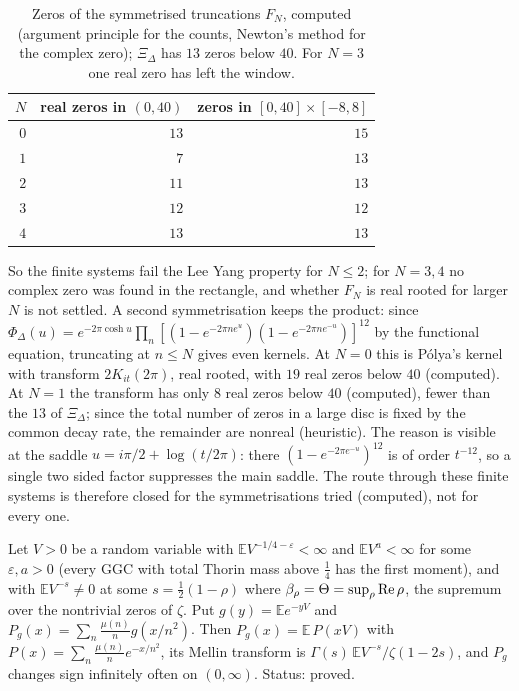 \begin{table}[htbp]
\centering\small
\begin{tabular}{rrr}
\toprule
$N$ & real zeros in $(0,40)$ & zeros in $[0,40]\times[-8,8]$\\
\midrule
$0$ & $13$ & $15$\\
$1$ & $7$ & $13$\\
$2$ & $11$ & $13$\\
$3$ & $12$ & $12$\\
$4$ & $13$ & $13$\\
\bottomrule
\end{tabular}
\caption{Zeros of the symmetrised truncations $F_N$, computed (argument principle for the counts, Newton's method for the complex zero); $\Xi_\Delta$ has $13$ zeros below $40$. For $N=3$ one real zero has left the window.}\label{dl:tab:r4}
\end{table}

So the finite systems fail the Lee Yang property for $N\le2$; for $N=3,4$ no complex zero was found in the rectangle, and whether $F_N$ is real rooted for larger $N$ is not settled. A second symmetrisation keeps the product: since $\Phi_\Delta(u)=e^{-2\pi\cosh u}\prod_n[(1-e^{-2\pi ne^u})(1-e^{-2\pi ne^{-u}})]^{12}$ by the functional equation, truncating at $n\le N$ gives even kernels. At $N=0$ this is P\'olya's kernel with transform $2K_{it}(2\pi)$, real rooted, with $19$ real zeros below $40$ (computed). At $N=1$ the transform has only $8$ real zeros below $40$ (computed), fewer than the $13$ of $\Xi_\Delta$; since the total number of zeros in a large disc is fixed by the common decay rate, the remainder are nonreal (heuristic). The reason is visible at the saddle $u=i\pi/2+\log(t/2\pi)$: there $(1-e^{-2\pi e^{-u}})^{12}$ is of order $t^{-12}$, so a single two sided factor suppresses the main saddle. The route through these finite systems is therefore closed for the symmetrisations tried (computed), not for every one.

\begin{proposition}\label{dl:prop:r5}
Let $V>0$ be a random variable with $\mathbb EV^{-1/4-\varepsilon}<\infty$ and $\mathbb EV^a<\infty$ for some $\varepsilon,a>0$ (every GGC with total Thorin mass above $\frac14$ has the first moment), and with $\mathbb EV^{-s}\ne0$ at some $s=\frac12(1-\rho)$ where $\beta_\rho=\Theta=\sup_\rho\operatorname{Re}\rho$, the supremum over the nontrivial zeros of $\zeta$. Put $g(y)=\mathbb Ee^{-yV}$ and $P_g(x)=\sum_n\frac{\mu(n)}ng(x/n^2)$. Then $P_g(x)=\mathbb E\,P(xV)$ with $P(x)=\sum_n\frac{\mu(n)}ne^{-x/n^2}$, its Mellin transform is $\Gamma(s)\,\mathbb EV^{-s}/\zeta(1-2s)$, and $P_g$ changes sign infinitely often on $(0,\infty)$. Status: proved.
\end{proposition}

